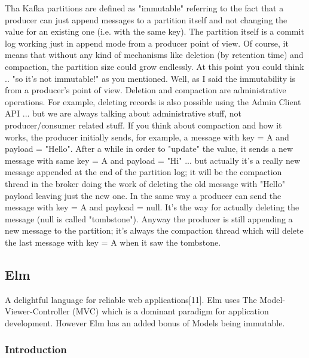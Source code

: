 \documentclass[12pt,twoside]{article}
\begin{document}
\thispagestyle{cluster}


Tha Kafka partitions are defined as "immutable" referring to the fact that a producer can just append messages to a partition itself and not changing the value for an existing one (i.e. with the same key). The partition itself is a commit log working just in append mode from a producer point of view. Of course, it means that without any kind of mechanisms like deletion (by retention time) and compaction, the partition size could grow endlessly. At this point you could think .. "so it's not immutable!" as you mentioned. Well, as I said the immutability is from a producer's point of view. Deletion and compaction are administrative operations. For example, deleting records is also possible using the Admin Client API ... but we are always talking about administrative stuff, not producer/consumer related stuff.
If you think about compaction and how it works, the producer initially sends, for example, a message with key = A and payload = "Hello". After a while in order to "update" the value, it sends a new message with same key = A and payload = "Hi" ... but actually it's a really new message appended at the end of the partition log; it will be the compaction thread in the broker doing the work of deleting the old message with "Hello" payload leaving just the new one. In the same way a producer can send the message with key = A and payload = null. It's the way for actually deleting the message (null is called "tombstone"). Anyway the producer is still appending a new message to the partition; it's always the compaction thread which will delete the last message with key = A when it saw the tombstone.


\subsection{Elm}

A delightful language
for reliable web applications[11].
Elm uses The Model-Viewer-Controller (MVC) which is a dominant paradigm for application development. However Elm has an added bonus of Models being immutable. 
\subsubsection{Introduction}
\end{document}
